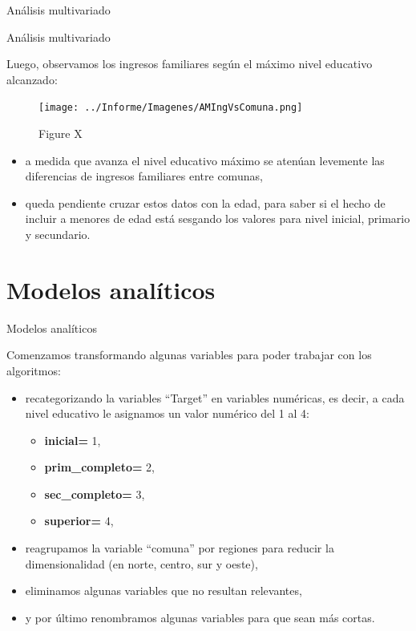 \documentclass[pdf]{beamer}
\def\vspace{}%
\begin{document}
{\begin{frame}{Análisis multivariado}
\end{frame}

\begin{frame}{Análisis multivariado}

    Luego, observamos los ingresos familiares según el máximo nivel educativo alcanzado:

    \begin{minipage}{0.55\textwidth}
        \begin{figure} 
        \texttt{[image: ../Informe/Imagenes/AMIngVsComuna.png]}
        \caption{Figure X}
        \end{figure}
    \end{minipage}
    \begin{minipage}{0.38\textwidth}
        \begin{itemize}
            \justifying%
            \item a medida que avanza el nivel educativo máximo se atenúan levemente las diferencias de ingresos familiares entre comunas,
            \item queda pendiente cruzar estos datos con la edad, para saber si el hecho de incluir a menores de edad está sesgando los valores para nivel inicial, primario y secundario.
        \end{itemize}
    \end{minipage}

\end{frame}

\section{Modelos analíticos}

\begin{frame}{Modelos analíticos}

    Comenzamos transformando algunas variables para poder trabajar con los algoritmos:
    \begin{itemize}
        \item recategorizando la variables ``Target'' en variables numéricas, es decir, a cada nivel educativo le asignamos un valor numérico del 1 al 4:
        \begin{itemize}
            \item \textbf{inicial=} 1,
            \item \textbf{prim\_completo=} 2,
            \item \textbf{sec\_completo=} 3,
            \item \textbf{superior=} 4,
        \end{itemize}
        \item reagrupamos la variable ``comuna'' por regiones para reducir la dimensionalidad (en norte, centro, sur y oeste),
        \item eliminamos algunas variables que no resultan relevantes, 
        \item y por último renombramos algunas variables para que sean más cortas.
    \end{itemize}
    

\end{frame}}
\end{document}

